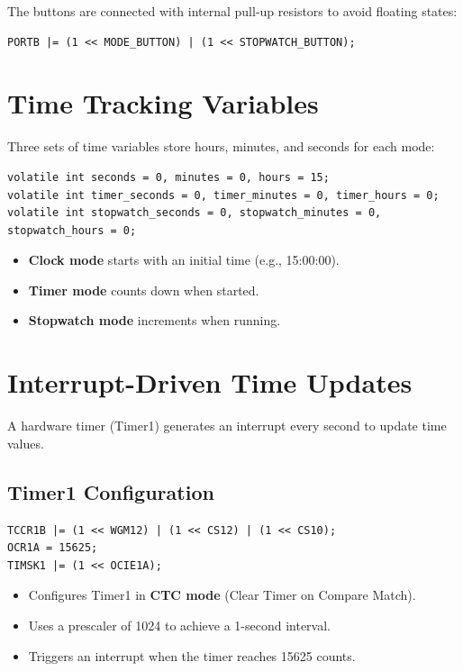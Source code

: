 \documentclass[a4paper,12pt]{article}
\begin{document}
The buttons are connected with internal pull-up resistors to avoid floating states:

\begin{lstlisting}
PORTB |= (1 << MODE_BUTTON) | (1 << STOPWATCH_BUTTON);
\end{lstlisting}

\section*{Time Tracking Variables}
Three sets of time variables store hours, minutes, and seconds for each mode:

\begin{lstlisting}
volatile int seconds = 0, minutes = 0, hours = 15;
volatile int timer_seconds = 0, timer_minutes = 0, timer_hours = 0;
volatile int stopwatch_seconds = 0, stopwatch_minutes = 0, stopwatch_hours = 0;
\end{lstlisting}

\begin{itemize}
    \item \textbf{Clock mode} starts with an initial time (e.g., 15:00:00).
    \item \textbf{Timer mode} counts down when started.
    \item \textbf{Stopwatch mode} increments when running.
\end{itemize}

\section*{Interrupt-Driven Time Updates}

A hardware timer (Timer1) generates an interrupt every second to update time values.

\subsection*{Timer1 Configuration}

\begin{lstlisting}
TCCR1B |= (1 << WGM12) | (1 << CS12) | (1 << CS10);
OCR1A = 15625;
TIMSK1 |= (1 << OCIE1A);
\end{lstlisting}

\begin{itemize}
    \item Configures Timer1 in \textbf{CTC mode} (Clear Timer on Compare Match).
    \item Uses a prescaler of 1024 to achieve a 1-second interval.
    \item Triggers an interrupt when the timer reaches 15625 counts.
\end{itemize}
\end{document}
